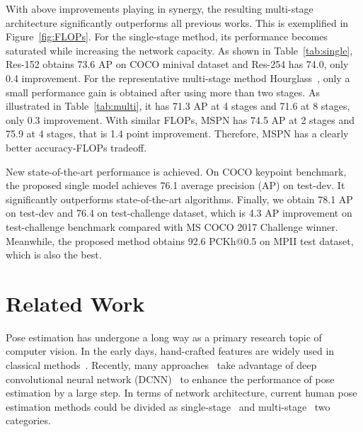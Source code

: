 \documentclass[10pt,twocolumn,letterpaper]{article}
\begin{document}
With above improvements playing in synergy, the resulting multi-stage architecture significantly outperforms all previous works. This is exemplified in Figure~\ref{fig:FLOPs}. For the single-stage method, its performance becomes saturated while increasing the network capacity. As shown in Table~\ref{tab:single}, Res-152 obtains 73.6 AP on COCO minival dataset and Res-254 has 74.0, only 0.4 improvement. For the representative multi-stage method Hourglass~\cite{newell2016stacked}, only a small performance gain is obtained after using more than two stages. As illustrated in Table~\ref{tab:multi}, it has 71.3 AP at 4 stages and 71.6 at 8 stages, only 0.3 improvement. With similar FLOPs, MSPN has 74.5 AP at 2 stages and 75.9 at 4 stages, that is 1.4 point improvement. Therefore, MSPN has a clearly better accuracy-FLOPs tradeoff.

New state-of-the-art performance is achieved. On COCO keypoint benchmark, the proposed single model achieves 76.1 average precision (AP) on test-dev. It significantly outperforms state-of-the-art algorithms. Finally, we obtain 78.1 AP on test-dev and 76.4 on test-challenge dataset, which is 4.3 AP improvement on test-challenge benchmark compared with MS COCO 2017 Challenge winner. Meanwhile, the proposed method obtains 92.6 PCKh@0.5 on MPII test dataset, which is also the best.

\section{Related Work}
Pose estimation has undergone a long way as a primary research topic of computer vision. In the early days, hand-crafted features are widely used in classical methods~\cite{andriluka2009pictorial,sapp2013modec,gkioxari2013articulated,sapp2010adaptive,dantone2013human,yang2011articulated,johnson2011learning,pishchulin2013poselet}. Recently, many approaches~\cite{bulat2016human,gkioxari2016chained,pishchulin2016deepcut,insafutdinov2016deepercut,carreira2016human,belagiannis2017recurrent} take advantage of deep convolutional neural network (DCNN)~\cite{krizhevsky2012imagenet} to enhance the performance of pose estimation by a large step. In terms of network architecture, current human pose estimation methods could be divided as single-stage~\cite{papandreou2017towards,he2017mask,chen2018cascaded,xiao2018simple} and multi-stage~\cite{wei2016convolutional,cao2016realtime,newell2017associative,newell2016stacked,yang2017learning,ke2018multi} two categories.
\end{document}
